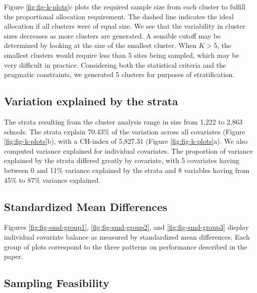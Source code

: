 \documentclass[
  english,
  man,floatsintext]{apa6}
\begin{document}
Figure \ref{fig:fig-k-plots}c plots the required sample size from each cluster to fulfill the proportional allocation requirement. The dashed line indicates the ideal allocation if all clusters were of equal size. We see that the variability in cluster sizes decreases as more clusters are generated. A sensible cutoff may be determined by looking at the size of the smallest cluster. When \(K > 5\), the smallest clusters would require less than 5 sites being sampled, which may be very difficult in practice. Considering both the statistical criteria and the pragmatic constraints, we generated 5 clusters for purposes of stratification.

\hypertarget{variation-explained-by-the-strata}{%
\subsection{Variation explained by the strata}\label{variation-explained-by-the-strata}}

The strata resulting from the cluster analysis range in size from 1,222 to 2,863 schools. The strata explain 70.43\% of the variation across all covariates (Figure \ref{fig:fig-k-plots}b), with a CH-index of 5,827.31 (Figure \ref{fig:fig-k-plots}a). We also computed variance explained for individual covariates. The proportion of variance explained by the strata differed greatly by covariate, with 5 covariates having between 0 and 11\% variance explained by the strata and 8 variables having from 45\% to 87\% variance explained.

\hypertarget{standardized-mean-differences-1}{%
\subsection{Standardized Mean Differences}\label{standardized-mean-differences-1}}

Figures \ref{fig:fig-smd-group1}, \ref{fig:fig-smd-group2}, and \ref{fig:fig-smd-group3} display individual covariate balance as measured by standardized mean differences. Each group of plots correspond to the three patterns on performance described in the paper.







\newpage

\hypertarget{sampling-feasibility}{%
\subsection{Sampling Feasibility}\label{sampling-feasibility}}
\end{document}
